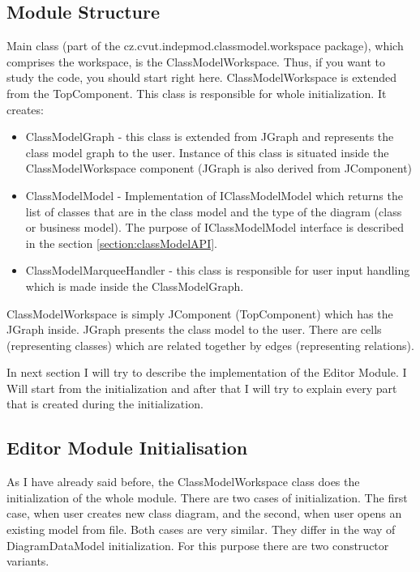 \subsection{Module Structure}
\label{section:editorModuleStructure}

Main class (part of the cz.cvut.indepmod.classmodel.workspace package), which comprises the workspace, is the ClassModelWorkspace. Thus, if you want to study the code, you should start right here. ClassModelWorkspace is extended from the TopComponent. This class is responsible for whole initialization. It creates:
\begin{itemize}
    \item ClassModelGraph - this class is extended from JGraph and represents the class model graph to the user. Instance of this class is situated inside the ClassModelWorkspace component (JGraph is also derived from JComponent)
    \item ClassModelModel - Implementation of IClassModelModel which returns the list of classes that are in the class model and the type of the diagram (class or business model). The purpose of IClassModelModel interface is described in the section \ref{section:classModelAPI}.
    \item ClassModelMarqueeHandler - this class is responsible for user input handling which is made inside the ClassModelGraph.
\end{itemize}

ClassModelWorkspace is simply JComponent (TopComponent) which has the JGraph inside. JGraph presents the class model to the user. There are cells (representing classes) which are related together by edges (representing relations).

In next section I will try to describe the implementation of the Editor Module. I Will start from the initialization and after that I will try to explain every part that is created during the initialization.

\subsection{Editor Module Initialisation}

As I have already said before, the ClassModelWorkspace class does the initialization of the whole module. There are two cases of initialization. The first case, when user creates new class diagram, and the second, when user opens an existing model from file. Both cases are very similar. They differ in the way of DiagramDataModel initialization. For this purpose there are two constructor variants.

